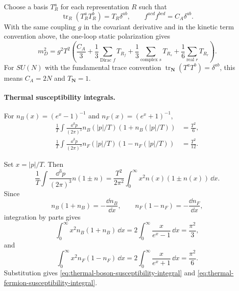 Choose a basis \(T^a_R\) for each representation \(R\) such that
\[
  \operatorname{tr}_R(T^a_RT^b_R)=T_R\delta^{ab},
  \qquad
  f^{acd}f^{bcd}=C_A\delta^{ab}.
\]
With the same coupling \(g\) in the covariant derivative and in the kinetic
term convention above, the one-loop static polarization gives
\begin{equation}
  m_D^2
  =
  g^2T^2\left(
  \frac{C_A}{3}
  +\frac{1}{3}\sum_{\text{Dirac }f}T_{R_f}
  +\frac{1}{3}\sum_{\text{complex }s}T_{R_s}
  +\frac{1}{6}\sum_{\text{real }r}T_{R_r}
  \right).
\label{eq:one-loop-debye-mass-general}
\end{equation}
For \(SU(N)\) with the fundamental trace convention
\(\operatorname{tr}_{\mathbf N}(T^aT^b)=\delta^{ab}\), this means
\(C_A=2N\) and \(T_{\mathbf N}=1\).

\paragraph{Thermal susceptibility integrals.}
For \(n_B(x)=(e^x-1)^{-1}\) and \(n_F(x)=(e^x+1)^{-1}\),
\begin{align}
  \frac1T\int\frac{\dd^3p}{(2\pi)^3}
  n_B(|p|/T)(1+n_B(|p|/T))
  &=
  \frac{T^2}{6},
  \label{eq:thermal-boson-susceptibility-integral}\\
  \frac1T\int\frac{\dd^3p}{(2\pi)^3}
  n_F(|p|/T)(1-n_F(|p|/T))
  &=
  \frac{T^2}{12}.
  \label{eq:thermal-fermion-susceptibility-integral}
\end{align}

Set \(x=|p|/T\).  Then
\[
  \frac1T\int\frac{\dd^3p}{(2\pi)^3}
  n(1\pm n)
  =
  \frac{T^2}{2\pi^2}
  \int_0^\infty x^2 n(x)(1\pm n(x))\,\dd x .
\]
Since
\[
  n_B(1+n_B)=-\frac{\dd n_B}{\dd x},
  \qquad
  n_F(1-n_F)=-\frac{\dd n_F}{\dd x},
\]
integration by parts gives
\[
  \int_0^\infty x^2n_B(1+n_B)\,\dd x
  =
  2\int_0^\infty \frac{x}{e^x-1}\,\dd x
  =
  \frac{\pi^2}{3},
\]
and
\[
  \int_0^\infty x^2n_F(1-n_F)\,\dd x
  =
  2\int_0^\infty \frac{x}{e^x+1}\,\dd x
  =
  \frac{\pi^2}{6}.
\]
Substitution gives
\eqref{eq:thermal-boson-susceptibility-integral} and
\eqref{eq:thermal-fermion-susceptibility-integral}.

